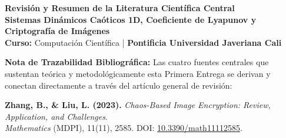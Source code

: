 \documentclass[11pt,letterpaper]{article}
\begin{document}
\begin{center}
    {\Large \textbf{Revisión y Resumen de la Literatura Científica Central}}\\[0.25cm]
    {\large \textbf{Sistemas Dinámicos Caóticos 1D, Coeficiente de Lyapunov y Criptografía de Imágenes}}\\[0.15cm]
    \small \textbf{Curso:} Computación Científica \quad | \quad \textbf{Pontificia Universidad Javeriana Cali}
\end{center}
\vspace{0.3cm}

\begin{tcolorbox}[colback=blue!5!white, colframe=blue!50!black, arc=1.5mm, boxrule=0.6pt]
\small
\textbf{Nota de Trazabilidad Bibliográfica:} Las cuatro fuentes centrales que sustentan teórica y metodológicamente esta Primera Entrega se derivan y conectan directamente a través del artículo general de revisión:
\begin{center}
    \textbf{Zhang, B., \& Liu, L. (2023).} \textit{Chaos-Based Image Encryption: Review, Application, and Challenges}. \\
    \textit{Mathematics} (MDPI), 11(11), 2585. DOI: \href{https://doi.org/10.3390/math11112585}{10.3390/math11112585}.
\end{center}
\end{tcolorbox}

\vspace{0.2cm}
\end{document}
